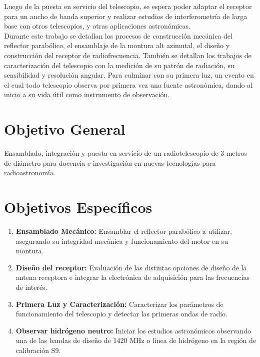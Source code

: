 Luego de la puesta en servicio del telescopio, se espera poder adaptar el receptor para un ancho de banda superior y realizar estudios de interferometría de larga base con otros telescopios, y otras aplicaciones astronómicas.\\

Durante este trabajo se detallan los procesos de construcción mecánica del reflector parabólico, el ensamblaje de la montura alt azimutal, el diseño y construcción del receptor de radiofrecuencia. También se detallan los trabajos de caracterización del telescopio con la medición de su patrón de radiación, su sensibilidad y resolución angular. Para culminar con su primera luz, un evento en el cual todo telescopio observa por primera vez una fuente astronómica, dando al inicio a su vida útil como instrumento de observación.\\


\section{Objetivo General}
Ensamblado, integración y puesta en servicio de un radiotelescopio de 3 metros de diámetro para docencia e investigación en nuevas tecnologías para radioastronomía.

\section{Objetivos Específicos}

\begin{enumerate}
    \item \textbf{Ensamblado Mecánico:} Ensamblar el reflector parabólico a utilizar, asegurando su integridad mecánica y funcionamiento del motor en su montura.
    \item \textbf{Diseño del receptor:} Evaluación de las distintas opciones de diseño de la antena receptora e integrar la electrónica de adquisición para las frecuencias de interés.
    \item \textbf{Primera Luz y Caracterización:} Caracterizar los parámetros de funcionamiento del telescopio y detectar las primeras ondas de radio.
    \item \textbf{Observar hidrógeno neutro:} Iniciar los estudios astronómicos observando una de las bandas de diseño de 1420 MHz o línea de hidrógeno en la región de calibración S9.

\end{enumerate}



